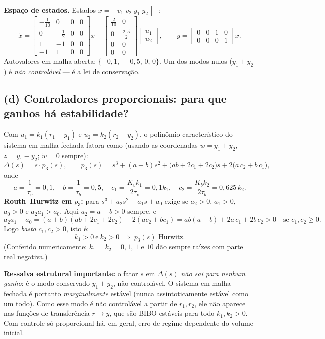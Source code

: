 \documentclass[11pt,a4paper]{article}
\begin{document}
\textbf{Espa\c{c}o de estados.} Estados $x=[\,v_1\;v_2\;y_1\;y_2\,]^{\!\top}$:
\[
\dot x=
\begin{bmatrix}
-\frac1{10}&0&0&0\\[1mm]
0&-\frac12&0&0\\[1mm]
1&-1&0&0\\[1mm]
-1&1&0&0
\end{bmatrix}x
+
\begin{bmatrix}
\frac{2}{10}&0\\[1mm]
0&\frac{2{,}5}{2}\\[1mm]
0&0\\[1mm]
0&0
\end{bmatrix}
\begin{bmatrix}u_1\\u_2\end{bmatrix},
\qquad
y=\begin{bmatrix}0&0&1&0\\0&0&0&1\end{bmatrix}x .
\]
Autovalores em malha aberta: $\{-0{,}1,\,-0{,}5,\,0,\,0\}$. Um dos modos nulos
($y_1+y_2$) \'e \emph{n\~ao control\'avel} --- \'e a lei de conserva\c{c}\~ao.

\subsection*{(d) Controladores proporcionais: para que ganhos h\'a estabilidade?}

Com $u_1=k_1(r_1-y_1)$ e $u_2=k_2(r_2-y_2)$, o polin\^omio caracter\'istico do
sistema em malha fechada fatora como (usando as coordenadas
$w=y_1+y_2$, $z=y_1-y_2$; $\dot w=0$ sempre):
\[
\Delta(s)=s\cdot p_3(s),
\qquad
p_3(s)=s^3+(a+b)s^2+\big(ab+2c_1+2c_2\big)s+2\big(a\,c_2+b\,c_1\big),
\]
onde
\[
a=\frac1{\tau_v}=0{,}1,\quad
b=\frac1{\tau_b}=0{,}5,\quad
c_1=\frac{K_vk_1}{2\tau_v}=0{,}1k_1,\quad
c_2=\frac{K_bk_2}{2\tau_b}=0{,}625\,k_2 .
\]
\textbf{Routh--Hurwitz em $p_3$:} para $s^3+a_2s^2+a_1s+a_0$ exige-se
$a_2>0$, $a_1>0$, $a_0>0$ e $a_2a_1>a_0$. Aqui $a_2=a+b>0$ sempre, e
\[
a_2a_1-a_0=(a+b)(ab+2c_1+2c_2)-2(ac_2+bc_1)
=ab(a+b)+2a\,c_1+2b\,c_2>0
\quad\text{se } c_1,c_2\ge0 .
\]
Logo \emph{basta} $c_1,c_2>0$, isto \'e:
\[
\boxed{\;k_1>0 \ \text{e}\ k_2>0\;\Longrightarrow\; p_3(s) \text{ Hurwitz.}\;}
\]
(Conferido numericamente: $k_1=k_2=0{,}1$, $1$ e $10$ d\~ao sempre ra\'izes com
parte real negativa.)

\textbf{Ressalva estrutural importante:} o fator $s$ em $\Delta(s)$ \emph{n\~ao sai
para nenhum ganho}: \'e o modo conservado $y_1+y_2$, n\~ao control\'avel. O sistema
em malha fechada \'e portanto \emph{marginalmente} est\'avel (nunca assintoticamente
est\'avel como um todo). Como esse modo \'e n\~ao control\'avel a partir de
$r_1,r_2$, ele n\~ao aparece nas fun\c{c}\~oes de transfer\^encia
$r\!\to\!y$, que s\~ao BIBO-est\'aveis para todo $k_1,k_2>0$. Com controle s\'o
proporcional h\'a, em geral, erro de regime dependente do volume inicial.
\end{document}
